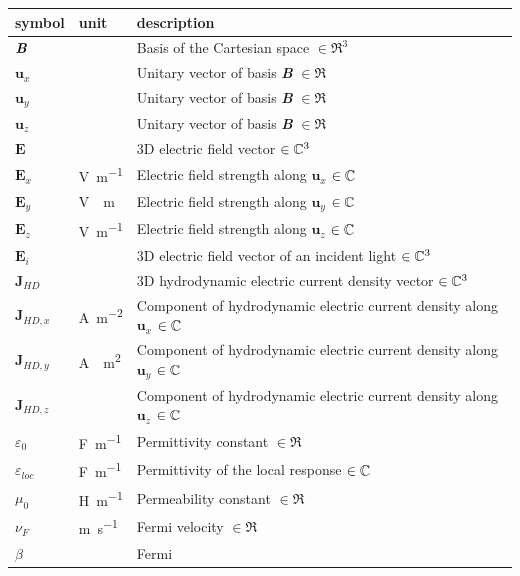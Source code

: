 \documentclass[12pt]{article}
\begin{document}
	\renewcommand{\arraystretch}{1.2} %
	\noindent \begin{longtable*}{l l p{12cm}} \toprule \textbf{symbol} &
		\textbf{unit} & \textbf{description}\\ \midrule $\textbf{\textit{B}}$ &   &
		Basis of the Cartesian space $\in \Re^3$ \\ $\textbf{u}_x$ & & Unitary vector
		of basis \textbf{\textit{B}} $\in \Re$ \\ $\textbf{u}_y$ & & Unitary vector of
		basis \textbf{\textit{B}} $\in \Re$ \\ $\textbf{u}_z$ & & Unitary vector of
		basis \textbf{\textit{B}} $\in \Re$ \\ $\textbf{E}$ &   & 3D electric field
		vector $\in \Bbb C^3$ \\ $\textbf{E}_x$ & \si{\volt \per \meter} & Electric
		field strength along $\textbf{u}_x$  $\in \Bbb C$ \\ $\textbf{E}_y$ & \si{\volt
			\per \meter} & Electric field strength along $\textbf{u}_y$ $\in \Bbb C$ \\
		$\textbf{E}_z$ & \si{\volt \per \meter} & Electric field strength along
		$\textbf{u}_z$ $\in \Bbb C$ \\ $\textbf{E}_i$ &   & 3D electric field vector of
		an incident light $\in \Bbb C^3$ \\ $\textbf{J}_{HD}$ &  & 3D hydrodynamic
		electric current density vector $\in \Bbb C^3$ \\ $\textbf{J}_{HD,x}$ &
		\si{\ampere \per \square \meter} & Component of hydrodynamic electric current
		density along $\textbf{u}_x$ $\in \Bbb C$ \\ $\textbf{J}_{HD,y}$ & \si{\ampere
			\per \square \meter} & Component of hydrodynamic electric current density along
		$\textbf{u}_y$ $\in \Bbb C$ \\ $\textbf{J}_{HD,z}$ & \si{\ampere \per \square
			\meter} & Component of hydrodynamic electric current density along
		$\textbf{u}_z$ $\in \Bbb C$ \\ $\varepsilon_0$ & \si{\farad \per \meter} &
		Permittivity constant $\in \Re$ \\ $\varepsilon_{loc}$ & \si{\farad \per
			\meter} & Permittivity  of the local response $\in \Bbb C$ \\ $\mu_0$ &
		\si{\henry \per \meter} & Permeability constant $\in \Re$ \\ $\nu_F$ &
		\si{\meter \per \second} & Fermi velocity $\in \Re$ \\ $\beta$ &  &Fermi

\end{longtable*}
\end{document}

